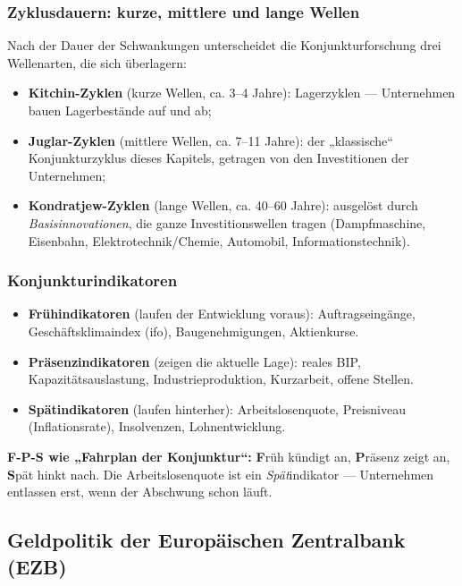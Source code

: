 \documentclass[11pt, a4paper]{article}
\begin{document}
\subsubsection{Zyklusdauern: kurze, mittlere und lange Wellen}

Nach der Dauer der Schwankungen unterscheidet die Konjunkturforschung drei Wellenarten,
die sich überlagern:

\begin{itemize}
  \item \textbf{Kitchin-Zyklen} (kurze Wellen, ca. 3--4 Jahre): Lagerzyklen ---
    Unternehmen bauen Lagerbestände auf und ab;
  \item \textbf{Juglar-Zyklen} (mittlere Wellen, ca. 7--11 Jahre): der „klassische``
    Konjunkturzyklus dieses Kapitels, getragen von den Investitionen der Unternehmen;
  \item \textbf{Kondratjew-Zyklen} (lange Wellen, ca. 40--60 Jahre): ausgelöst durch
    \emph{Basisinnovationen}, die ganze Investitionswellen tragen (Dampfmaschine,
    Eisenbahn, Elektrotechnik/Chemie, Automobil, Informationstechnik).
\end{itemize}

\subsubsection{Konjunkturindikatoren}

\begin{itemize}
  \item \textbf{Frühindikatoren} (laufen der Entwicklung voraus): Auftragseingänge,
    Geschäftsklimaindex (ifo), Baugenehmigungen, Aktienkurse.
  \item \textbf{Präsenzindikatoren} (zeigen die aktuelle Lage): reales BIP,
    Kapazitätsauslastung, Industrieproduktion, Kurzarbeit, offene Stellen.
  \item \textbf{Spätindikatoren} (laufen hinterher): Arbeitslosenquote, Preisniveau
    (Inflationsrate), Insolvenzen, Lohnentwicklung.
\end{itemize}

\begin{eselsbruecke}
\textbf{F-P-S wie „Fahrplan der Konjunktur``:} \textbf{F}rüh kündigt an,
\textbf{P}räsenz zeigt an, \textbf{S}pät hinkt nach. Die Arbeitslosenquote ist ein
\emph{Spät}indikator --- Unternehmen entlassen erst, wenn der Abschwung schon läuft.
\end{eselsbruecke}

\subsection{Geldpolitik der Europäischen Zentralbank (EZB)}
\end{document}
